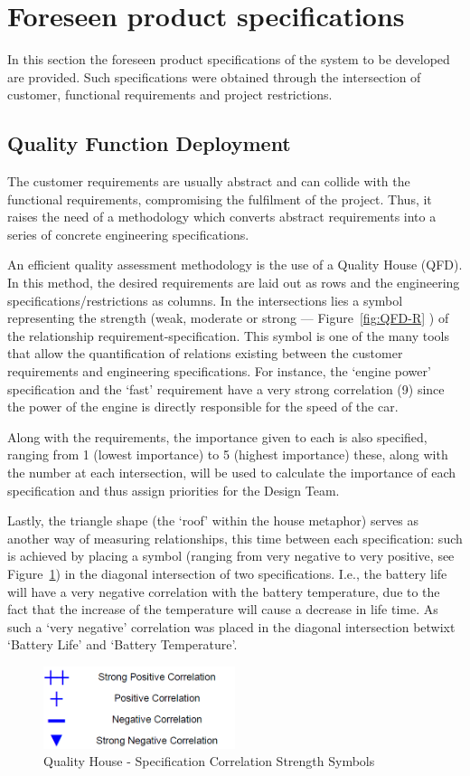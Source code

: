 \section{Foreseen product specifications}%
\label{sec:org31f7574}
In this section the foreseen product specifications of the system to be developed are provided. Such specifications were obtained through the intersection of customer, functional requirements and project restrictions.
\subsection{Quality Function Deployment}%
\label{sec:qfd}
The customer requirements are usually abstract and can collide with the functional requirements, compromising the fulfilment of the project. Thus, it raises the need of a methodology which converts abstract requirements into a series of concrete engineering specifications.

An efficient quality assessment methodology is the use of a Quality House (QFD). In this method, the desired requirements are laid out as rows and the engineering specifications/restrictions as columns. In the intersections lies a symbol representing the strength (weak, moderate or strong --- Figure~\ref{fig:QFD-R} ) of the relationship requirement-specification. This symbol is one of the many tools that allow the quantification of relations existing between the customer requirements and engineering specifications.
For instance, the `engine power' specification and the `fast' requirement have a
very strong correlation (9) since the power of the engine is directly
responsible for the speed of the car.

Along with the requirements, the importance given to each is also specified, ranging from 1 (lowest importance) to 5 (highest importance) these, along with the number at each intersection, will be used to calculate the importance of each specification and thus assign priorities for the Design Team.

Lastly, the triangle shape (the `roof' within the house metaphor) serves as another way of measuring relationships, this time between each specification: such is achieved by placing a symbol (ranging from very negative to very positive, see Figure~\ref{fig:QFD-Roof}) in the diagonal intersection of two specifications. 
I.e., the battery life will have a very negative correlation with the battery temperature, due to the fact that the increase of the temperature will cause a decrease in life time. As such a `very negative' correlation was placed in the diagonal intersection betwixt `Battery Life' and `Battery Temperature'. 
\begin{figure}[!htbp]
   \centering
       \includegraphics[page=1,width=0.5\textwidth]{sec/img/Roof_Symbols.png} 
 \caption{Quality House - Specification Correlation Strength Symbols}%
\label{fig:QFD-Roof}
\end{figure}

